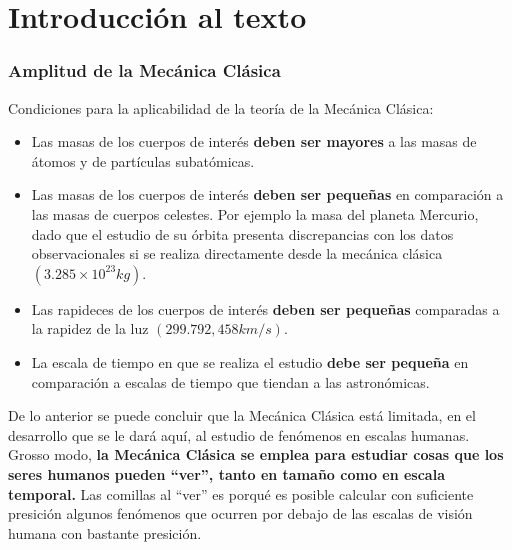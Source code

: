 \documentclass[/home/hernan-barquero/Documents/Apuntes_mecanica_teorica/main.tex]{subfiles}
\begin{document}
    \part{Introducción al texto}
    \label{part: intro}
    
    \section{Amplitud de la Mecánica Clásica}


    Condiciones para la aplicabilidad de la teoría de la Mecánica Clásica:

    \begin{itemize}
        \item Las masas de los cuerpos de interés \textbf{deben ser mayores} a las masas de átomos y de partículas subatómicas.
        \item Las masas de los cuerpos de interés \textbf{deben ser pequeñas} en comparación a las masas de cuerpos celestes. Por ejemplo la masa del planeta Mercurio, dado que el estudio de su órbita presenta discrepancias con los datos observacionales si se realiza directamente desde la mecánica clásica $\left(3.285 \times 10^{23} kg\right)$.
        \item Las rapideces de los cuerpos de interés  \textbf{deben ser pequeñas} comparadas a la rapidez de la luz $\left(299.792,458 km/s\right)$.
        \item  La escala de tiempo en que se realiza el estudio \textbf{debe ser pequeña} en comparación a escalas de tiempo que tiendan a las astronómicas.
    \end{itemize}

    De lo anterior se puede concluir que la Mecánica Clásica está limitada, en el desarrollo que se le dará aquí, al estudio de fenómenos en escalas humanas. Grosso modo, \textbf{la Mecánica Clásica se emplea para estudiar cosas que los seres humanos pueden ``ver'', tanto en tamaño como en escala temporal.} Las comillas al ``ver'' es porqué es posible calcular con suficiente presición algunos fenómenos que ocurren por debajo de las escalas de visión humana con bastante presición.
\end{document}
